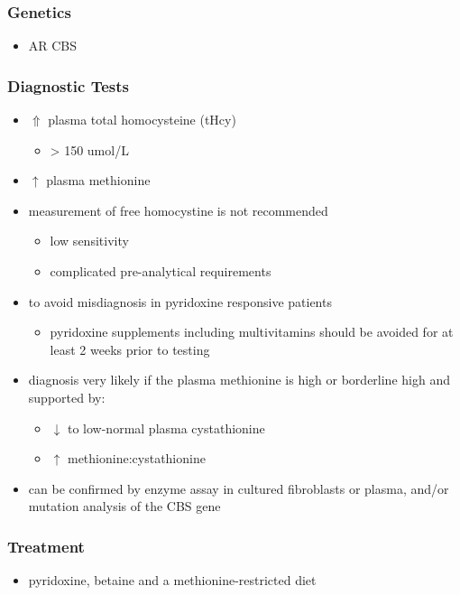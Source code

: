 \documentclass[12pt]{scrartcl}
\begin{document}
\begin{center}
\begin{center}
\subsubsection{Genetics}
\label{sec:orgff77927}
\begin{itemize}
\item AR CBS
\end{itemize}

\subsubsection{Diagnostic Tests}
\label{sec:org27cb091}
\begin{itemize}
\item \(\Uparrow\) plasma total homocysteine (tHcy)
\begin{itemize}
\item \textgreater{} 150 umol/L
\end{itemize}
\item \(\uparrow\) plasma methionine
\item measurement of free homocystine is not recommended
\begin{itemize}
\item low sensitivity
\item complicated pre-analytical requirements
\end{itemize}
\item to avoid misdiagnosis in pyridoxine responsive patients
\begin{itemize}
\item pyridoxine supplements including multivitamins should be avoided
for at least 2 weeks prior to testing
\end{itemize}
\item diagnosis very likely if the plasma methionine is high or borderline
high and supported by:
\begin{itemize}
\item \(\downarrow\) to low-normal plasma cystathionine
\item \(\uparrow\) methionine:cystathionine
\end{itemize}
\item can be confirmed by enzyme assay in cultured fibroblasts or plasma,
and/or mutation analysis of the CBS gene
\end{itemize}

\subsubsection{Treatment}
\label{sec:org0be108d}
\begin{itemize}
\item pyridoxine, betaine and a methionine-restricted diet
\end{itemize}


\end{center}
\end{center}
\end{document}
